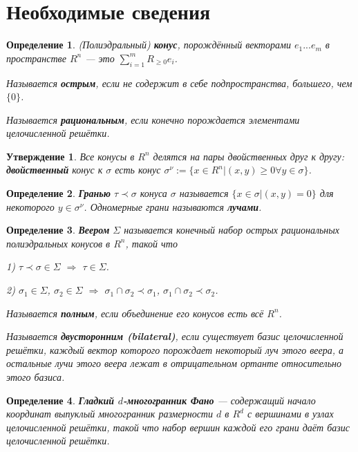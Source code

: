 \documentclass[12pt,notitlepage]{article}
\newtheorem{definition}{Определение}
\newtheorem{statement}{Утверждение}
\begin{document}
	\section{Необходимые сведения}
	
	\begin{definition}
		(Полиэдральный) \textbf{конус}, порождённый векторами $e_1 ... e_m$ в пространстве $R^n$ --- это $\sum_{i=1}^m R_{\geq 0} e_i$.
		
		Называется \textbf{острым}, если не содержит в себе подпространства, большего, чем $\{0\}$.
		
		Называется \textbf{рациональным}, если конечно порождается элементами целочисленной решётки.
	\end{definition}
	\begin{statement}
		Все конусы в $R^n$ делятся на пары двойственных друг к другу: \textbf{двойственный} конус к $\sigma$ есть конус $\sigma^\nu := \{x \in R^n | (x, y) \geq 0 \forall y \in \sigma\}$.
	\end{statement}
	\begin{definition}
		\textbf{Гранью} $\tau \prec \sigma$ конуса $\sigma$ называется $\{x \in \sigma |(x, y) = 0\}$ для некоторого $y \in \sigma^\nu$. Одномерные грани называются \textbf{лучами}.
	\end{definition}
	\begin{definition}
		\textbf{Веером} $\Sigma$ называется конечный набор острых рациональных полиэдральных конусов в $R^n$, такой что
		
		1) $\tau \prec \sigma \in \Sigma$ $\Rightarrow$ $\tau \in \Sigma$.
		
		2) $\sigma_1 \in \Sigma$, $\sigma_2 \in \Sigma$ $\Rightarrow$ $\sigma_1 \cap \sigma_2 \prec \sigma_1$, $\sigma_1 \cap \sigma_2 \prec \sigma_2$.
		
		Называется \textbf{полным}, если объединение его конусов есть всё $R^n$.
		
		Называется \textbf{двусторонним (bilateral)}, если существует базис целочисленной решётки, каждый вектор которого порождает некоторый луч этого веера, а остальные лучи этого веера лежат в отрицательном ортанте относительно этого базиса.
	\end{definition}
	\begin{definition}
		\textbf{Гладкий $d$-многогранник Фано} --- содержащий начало координат выпуклый многогранник размерности $d$ в $R^d$ с вершинами в узлах целочисленной решётки, такой что набор вершин каждой его грани даёт базис целочисленной решётки.
	\end{definition}
\end{document}
